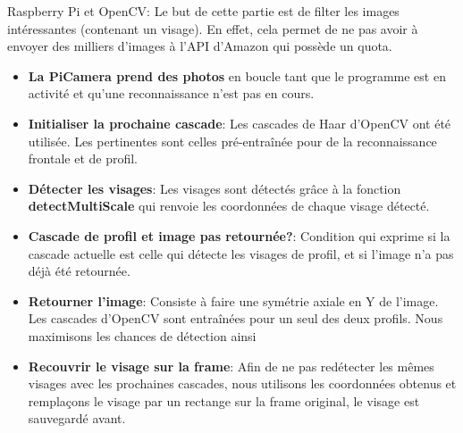 Raspberry Pi et OpenCV:
Le but de cette partie est de filter les images intéressantes (contenant un visage). En effet,
cela permet de ne pas avoir à envoyer des milliers d'images à l'API d'Amazon qui possède un quota.
\begin{itemize}
    \item \textbf{La PiCamera prend des photos} en boucle tant que le programme est en activité et qu'une reconnaissance n'est pas en cours.
    \item \textbf{Initialiser la prochaine cascade}: Les cascades de Haar d'OpenCV ont été utilisée. Les pertinentes sont celles pré-entraînée pour de la reconnaissance frontale et de profil.
    \item \textbf{Détecter les visages}: Les visages sont détectés grâce à la fonction \textbf{detectMultiScale} qui renvoie les coordonnées de chaque visage détecté.
    \item \textbf{Cascade de profil et image pas retournée?}: Condition qui exprime si la cascade actuelle est celle qui détecte les visages de profil, et si l'image n'a pas déjà été retournée.
    \item \textbf{Retourner l'image}: Consiste à faire une symétrie axiale en Y de l'image. Les cascades d'OpenCV sont entraînées pour un seul des deux profils. Nous maximisons les chances de détection ainsi
    \item \textbf{Recouvrir le visage sur la frame}: Afin de ne pas redétecter les mêmes visages avec les prochaines cascades, nous utilisons les coordonnées obtenus et remplaçons le visage par un rectange sur la frame original, le visage est sauvegardé avant.
\end{itemize}

